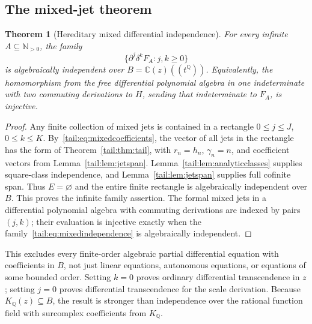 \documentclass[11pt,a4paper]{article}
\numberwithin{equation}{section}
\newtheorem{theorem}{Theorem}[section]
\theoremstyle{definition}
\theoremstyle{remark}
\newcommand{\C}{\mathbb C}
\newcommand{\Q}{\mathbb Q}
\newcommand{\N}{\mathbb N}
\newcommand{\EDer}{\delta}
\begin{document}
\subsection{The mixed-jet theorem}
\begin{theorem}[Hereditary mixed differential independence]\label{tail:thm:mixed}
For every infinite $A\subseteq\N_{>0}$, the family
\begin{equation}\label{tail:eq:mixedindependence}
 \{\partial^j\EDer^kF_A:j,k\geq0\}
\end{equation}
is algebraically independent over $B=\C(z)((t^\Q))$.
Equivalently, the homomorphism from the free differential polynomial
algebra in one indeterminate with two commuting derivations to $H$,
sending that indeterminate to $F_A$, is injective.
\end{theorem}
\begin{proof}
Any finite collection of mixed jets is contained in a rectangle
$0\leq j\leq J$, $0\leq k\leq K$. By~\eqref{tail:eq:mixedcoefficients}, the
vector of all jets in the rectangle has the form of
Theorem~\ref{tail:thm:tail}, with $r_n=h_n$, $\gamma_n=n$, and coefficient
vectors from Lemma~\ref{tail:lem:jetspan}. Lemma~\ref{tail:lem:analyticclasses}
supplies square-class independence, and Lemma~\ref{tail:lem:jetspan} supplies
full cofinite span. Thus $E=\varnothing$ and the entire finite rectangle
is algebraically independent over $B$. This proves the infinite family
assertion. The formal mixed jets in a differential polynomial algebra
with commuting derivations are indexed by pairs $(j,k)$; their evaluation
is injective exactly when the family~\eqref{tail:eq:mixedindependence} is
algebraically independent.
\end{proof}

This excludes every finite-order algebraic partial differential equation
with coefficients in $B$, not just linear equations, autonomous equations,
or equations of some bounded order. Setting $k=0$ proves ordinary
differential transcendence in $z$; setting $j=0$ proves differential
transcendence for the scale derivation. Because $K_\Q(z)\subseteq B$,
the result is stronger than independence over the rational function field
with surcomplex coefficients from $K_\Q$.
\end{document}
